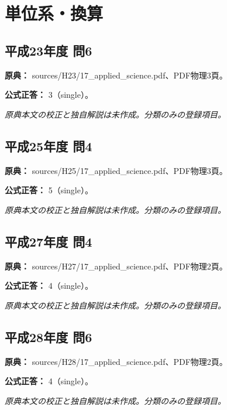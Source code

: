 \section{単位系・換算}

\subsection{平成23年度 問6}
\label{q:h23-reg-applied-06}

\noindent\textbf{原典：} sources/H23/17\_applied\_science.pdf、PDF物理3頁。

\textbf{公式正答：} 3（single）。

\par\textit{原典本文の校正と独自解説は未作成。分類のみの登録項目。}

\subsection{平成25年度 問4}
\label{q:h25-reg-applied-04}

\noindent\textbf{原典：} sources/H25/17\_applied\_science.pdf、PDF物理3頁。

\textbf{公式正答：} 5（single）。

\par\textit{原典本文の校正と独自解説は未作成。分類のみの登録項目。}

\subsection{平成27年度 問4}
\label{q:h27-reg-applied-04}

\noindent\textbf{原典：} sources/H27/17\_applied\_science.pdf、PDF物理2頁。

\textbf{公式正答：} 4（single）。

\par\textit{原典本文の校正と独自解説は未作成。分類のみの登録項目。}

\subsection{平成28年度 問6}
\label{q:h28-reg-applied-06}

\noindent\textbf{原典：} sources/H28/17\_applied\_science.pdf、PDF物理2頁。

\textbf{公式正答：} 4（single）。

\par\textit{原典本文の校正と独自解説は未作成。分類のみの登録項目。}

